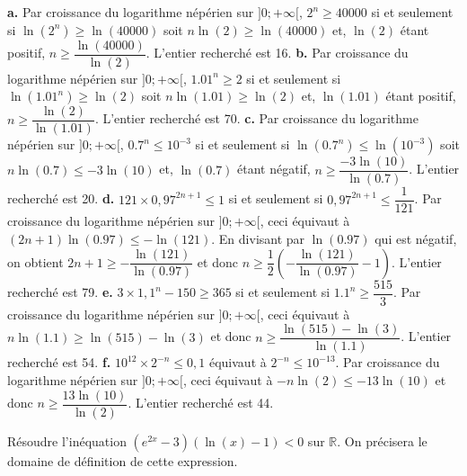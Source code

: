 \documentclass[11pt,fleqn, openany]{book} %
\begin{document}
\begin{solution}\textbf{a.}  Par croissance du logarithme népérien sur $]0;+\infty[$, $2^n \geqslant 40000$ si et seulement si $\ln(2^n) \geqslant \ln(40000)$ soit $n\ln(2) \geqslant \ln(40000)$ et, $\ln(2)$ étant positif, $n \geqslant \dfrac{\ln(40000)}{\ln(2)}$. L'entier recherché est 16.
\vskip5pt
\textbf{b.}  Par croissance du logarithme népérien sur $]0;+\infty[$, $1.01^n \geqslant 2$ si et seulement si $\ln(1.01^n) \geqslant \ln(2)$ soit $n\ln(1.01) \geqslant \ln(2)$ et, $\ln(1.01)$ étant positif, $n \geqslant \dfrac{\ln(2)}{\ln(1.01)}$. L'entier recherché est 70.
\vskip5pt
\textbf{c.}  Par croissance du logarithme népérien sur $]0;+\infty[$, $0.7^n \leqslant 10^{-3}$ si et seulement si $\ln(0.7^n) \leqslant \ln(10^{-3})$ soit $n\ln(0.7) \leqslant -3\ln(10)$ et, $\ln(0.7)$ étant négatif, $n \geqslant \dfrac{-3\ln(10)}{\ln(0.7)}$. L'entier recherché est 20.
\vskip5pt
\textbf{d.} \(121 \times 0,97^{2n+1} \leqslant 1\) si et seulement si \(0,97^{2n+1} \leqslant \dfrac{1}{121}\). Par croissance du logarithme népérien sur \(]0;+\infty[\), ceci équivaut à \((2n+1)\ln(0.97) \leqslant -\ln(121)\). En divisant par \(\ln(0.97)\) qui est négatif, on obtient \(2n+1\geqslant -\dfrac{\ln(121)}{\ln(0.97)}\) et donc \(n \geqslant \dfrac{1}{2}\left(-\dfrac{\ln(121)}{\ln(0.97)}-1\right)\). L'entier recherché est 79.
\vskip5pt
\textbf{e.} \(3 \times 1,1^n -150 \geqslant 365\) si et seulement si \(1.1^n \geqslant \dfrac{515}{3}\). Par croissance du logarithme népérien sur \(]0;+\infty[\), ceci équivaut à \(n\ln(1.1)\geqslant \ln(515)-\ln(3)\) et donc \(n\geqslant \dfrac{\ln(515)-\ln(3)}{\ln(1.1)}\). L'entier recherché est 54.
\vskip5pt
\textbf{f.}  \( 10^{12}\times 2^{-n} \leqslant 0,1\) équivaut à \(2^{-n} \leqslant 10^{-13}\). Par croissance du logarithme népérien sur \(]0;+\infty[\), ceci équivaut à \(-n\ln(2) \leqslant -13\ln(10)\) et donc \(n\geqslant \dfrac{13\ln(10)}{\ln(2)}\). L'entier recherché est 44.
\end{solution}



\begin{exercise}Résoudre l'inéquation $(e^{2x}-3)(\ln(x)-1)<0$ sur $\mathbb{R}$. On précisera le domaine de définition de cette expression.\end{exercise}
\end{document}
